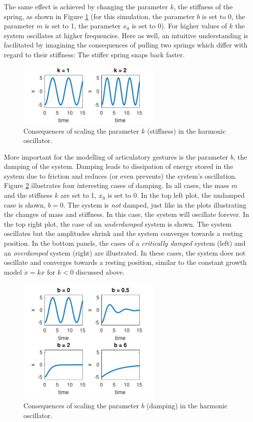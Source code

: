 The same effect is achieved by changing the parameter $k$, the stiffness of the spring, as shown in Figure \ref{fig:dho_stiff} (for this simulation, the parameter $b$ is set to 0, the parameter $m$ is set to 1, the parameter $x_0$ is set to 0). For higher values of $k$ the system oscillates at higher frequencies. Here as well, an intuitive understanding is facilitated by imagining the consequences of pulling two springs which differ with regard to their stiffness: The stiffer spring snaps back faster.

\begin{figure}
\includegraphics[width=7cm]{figures/ch3/dho_stiffness.pdf}
\caption{Consequences of scaling the parameter $k$ (stiffness) in the harmonic oscillator.}
\label{fig:dho_stiff}
\end{figure}

More important for the modelling of articulatory gestures is the parameter $b$, the damping of the system. Damping leads to dissipation of energy stored in the system due to friction and reduces (or even prevents) the system’s oscillation. Figure \ref{fig:dho_damp} illustrates four interesting cases of damping. In all cases, the mass $m$ and the stiffness $k$ are set to 1, $x_0$ is set to 0. In the top left plot, the undamped case is shown, $b = 0$. The system is \emph{not} damped, just like in the plots illustrating the changes of mass and stiffness. In this case, the system will oscillate forever. In the top right plot, the case of an \emph{underdamped} system is shown. The system oscillates but the amplitudes shrink and the system converges towards a resting position. In the bottom panels, the cases of a \emph{critically damped} system (left) and an \emph{overdamped} system (right) are illustrated. In these cases, the system does not oscillate and converges towards a resting position, similar to the constant growth model $\dot{x} = kx$ for $k<0$ discussed above.

\begin{figure}
\includegraphics[width=7cm]{figures/ch3/dho_damping.pdf}
\caption{Consequences of scaling the parameter $b$ (damping) in the harmonic oscillator.}
\label{fig:dho_damp}
\end{figure}


